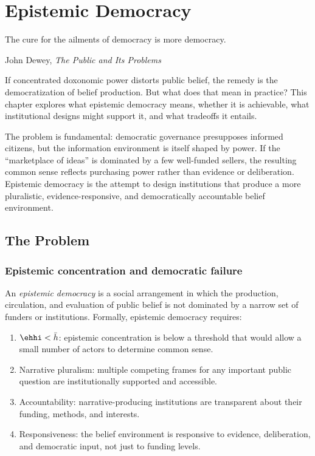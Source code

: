 \chapter{Epistemic Democracy}
\label{ch:epistemic-democracy}

\epigraph{The cure for the ailments of democracy is more democracy.}{John Dewey, \textit{The Public and Its Problems}}

\noindent
If concentrated doxonomic power distorts public belief, the remedy is the democratization of belief production.
But what does that mean in practice?
This chapter explores what epistemic democracy means, whether it is achievable, what institutional designs might support it, and what tradeoffs it entails.

The problem is fundamental: democratic governance presupposes informed citizens, but the information environment is itself shaped by power.
If the ``marketplace of ideas'' is dominated by a few well-funded sellers, the resulting common sense reflects purchasing power rather than evidence or deliberation.
Epistemic democracy is the attempt to design institutions that produce a more pluralistic, evidence-responsive, and democratically accountable belief environment.

\section{The Problem}
\label{sec:ch32-problem}

\subsection{Epistemic concentration and democratic failure}

\begin{definition}
\label{def:epistemic-democracy}
An \emph{epistemic democracy} is a social arrangement in which the production, circulation, and evaluation of public belief is not dominated by a narrow set of funders or institutions.
Formally, epistemic democracy requires:
\begin{enumerate}[nosep]
  \item $\ehhi < \bar{h}$: epistemic concentration is below a threshold that would allow a small number of actors to determine common sense.
  \item Narrative pluralism: multiple competing frames for any important public question are institutionally supported and accessible.
  \item Accountability: narrative-producing institutions are transparent about their funding, methods, and interests.
  \item Responsiveness: the belief environment is responsive to evidence, deliberation, and democratic input, not just to funding levels.
\end{enumerate}
\end{definition}


